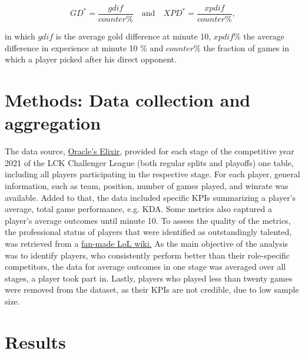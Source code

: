 \documentclass{article}
\begin{document}
\begin{equation}
GD^*  =  \frac{gdif}{counter \%} 
\quad\mathrm{and}\quad
XPD^* =  \frac{xpdif}{counter \%} ,
\end{equation}

in which $gdif$ is the average gold difference at minute 10,
$xpdif\%$ the average difference in experience at minute 10 $\%$ and
$counter\%$ the fraction of games in which a player picked after his direct opponent.


\section{Methods: Data collection and aggregation}


The data source,
\href{https://oracleselixir.com/stats/players/byTournament}{Oracle's Elixir}, provided for each  stage of the competitive year 2021 of the LCK Challenger League (both regular splits and playoffs) one table, including all players participating in the respective stage. For each player, general information, such as team, position, number of games played, and winrate was available. Added to that, the data included specific KPIs summarizing a player's average, total game performance, e.g. KDA. Some metrics also captured a player's average outcomes until minute 10. To assess the quality of the metrics, the professional status of players that were identified as outstandingly talented, was retrieved from a \href{https://lol.fandom.com/wiki/League_of_Legends_Esports_Wiki}{fan-made LoL wiki.}  \newline
As the main objective of the analysis was to identify players, who consistently perform better than their role-specific competitors, the data for average outcomes in one stage was averaged over all stages, a player took part in. Lastly, players who played less than twenty games were removed from the dataset, as their KPIs are not credible, due to low sample size.
\section{Results}
\setlength{\intextsep}{0.00005cm}
\end{document}
